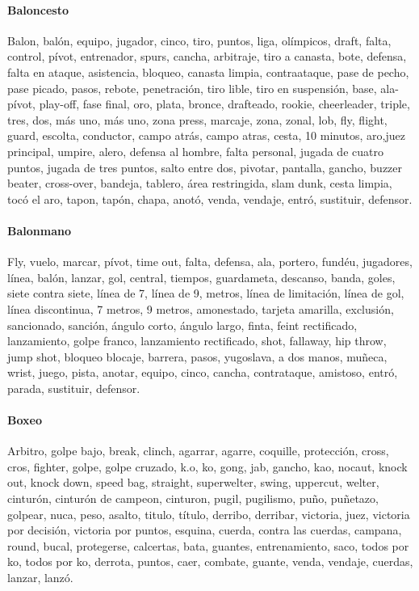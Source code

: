 \documentclass[../all.tex]{subfiles}
\begin{document}
    \paragraph{Baloncesto}
    Balon, balón, equipo, jugador, cinco, tiro, puntos, liga, olímpicos, draft, falta, control, pívot, entrenador, spurs, cancha, arbitraje, tiro a canasta, bote, defensa, falta en ataque, asistencia, bloqueo, canasta limpia, contraataque, pase de pecho, pase picado, pasos, rebote, penetración, tiro lible, tiro en suspensión, base, ala-pívot, play-off, fase final, oro, plata, bronce, drafteado, rookie, cheerleader, triple, tres, dos, más uno, más uno, zona press, marcaje, zona, zonal, lob, fly, flight, guard, escolta, conductor, campo atrás, campo atras, cesta, 10 minutos, aro,juez principal, umpire, alero, defensa al hombre, falta personal, jugada de cuatro puntos, jugada de tres puntos, salto entre dos, pivotar, pantalla, gancho, buzzer beater, cross-over, bandeja, tablero, área restringida, slam dunk, cesta limpia, tocó el aro, tapon, tapón, chapa, anotó, venda, vendaje, entró, sustituir, defensor.
    \paragraph{Balonmano}
    Fly, vuelo, marcar, pívot, time out, falta, defensa, ala, portero, fundéu, jugadores, línea, balón, lanzar, gol, central, tiempos, guardameta, descanso, banda, goles, siete contra siete, línea de 7, línea de 9, metros, línea de limitación, línea de gol, línea discontinua, 7 metros, 9 metros, amonestado, tarjeta amarilla, exclusión, sancionado, sanción, ángulo corto, ángulo largo, finta, feint rectificado, lanzamiento, golpe franco, lanzamiento rectificado, shot, fallaway, hip throw, jump shot, bloqueo blocaje, barrera, pasos, yugoslava, a dos manos, muñeca, wrist, juego, pista, anotar, equipo, cinco, cancha, contrataque, amistoso, entró, parada, sustituir, defensor.
    \paragraph{Boxeo}
    Arbitro, golpe bajo, break, clinch, agarrar, agarre, coquille, protección, cross, cros, fighter, golpe, golpe cruzado, k.o, ko, gong, jab, gancho, kao, nocaut, knock out, knock down, speed bag, straight, superwelter, swing, uppercut, welter, cinturón, cinturón de campeon, cinturon, pugil, pugilismo, puño, puñetazo, golpear, nuca, peso, asalto, titulo, título, derribo, derribar, victoria, juez, victoria por decisión, victoria por puntos, esquina, cuerda, contra las cuerdas, campana, round, bucal, protegerse, calcertas, bata, guantes, entrenamiento, saco, todos por ko, todos por ko, derrota, puntos, caer, combate, guante, venda, vendaje, cuerdas, lanzar, lanzó.
\end{document}
